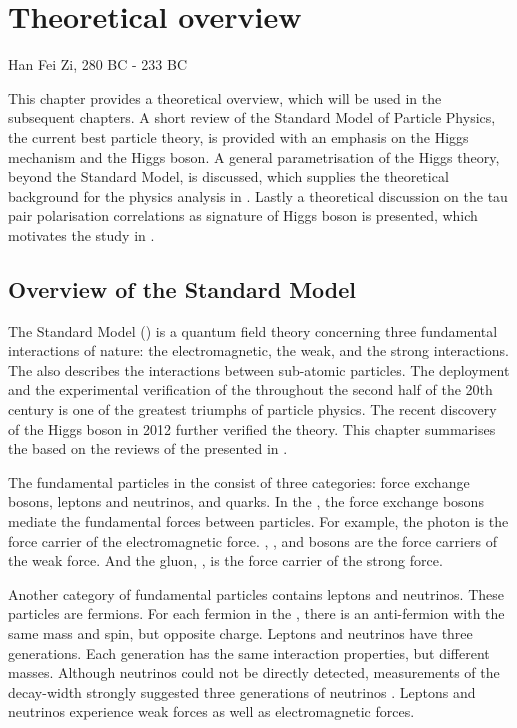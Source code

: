\chapter{Theoretical overview}
\label{chap:Theory}

%
{Han Fei Zi, 280 BC - 233 BC}%

This chapter provides a theoretical overview, which will be used in the subsequent  chapters. A short review of the Standard Model of Particle Physics, the current best particle theory, is provided with an emphasis on the Higgs mechanism and the Higgs boson. A general parametrisation of the Higgs theory, beyond the Standard Model, is discussed, which supplies the theoretical background for the physics analysis in . Lastly a theoretical discussion on the tau pair polarisation correlations as signature of Higgs boson is presented, which motivates the study in .

\section{Overview of the Standard Model}

The Standard Model (\SM) is a quantum field theory concerning three fundamental interactions of nature: the electromagnetic, the weak, and the strong interactions. The \SM also describes the interactions between sub-atomic particles. The deployment and the experimental verification of the \SM throughout the second half of the 20th century is one of the greatest triumphs of particle physics. The recent discovery of the Higgs boson in 2012 \cite{Aad:2012tfa,Chatrchyan:2012ufa} further verified the theory. This chapter summarises the \SM based on the reviews of the \SM presented in \cite{Agashe:2014kda,Thomson:2013zua,Tong:QFT,Gripaios:GFT}.

The fundamental particles in the \SM consist of three categories: force exchange bosons, leptons and neutrinos, and quarks. In the \SM, the force exchange bosons mediate the fundamental forces between particles. For example, the photon is the force carrier of the electromagnetic force. \PWp, \PWm, and \PZ  bosons are the force carriers of the weak force. And the gluon, \Pg, is the force carrier of the strong force.


Another category of fundamental particles contains leptons and neutrinos. These particles are fermions. For each fermion in the \SM, there is an anti-fermion with the same mass and spin, but opposite charge. Leptons and neutrinos have three generations. Each generation has the same interaction properties, but different masses. Although neutrinos could not be directly detected, measurements of the \PZ decay-width strongly suggested three generations of neutrinos \cite{ALEPH:2005ab}. Leptons and neutrinos experience weak forces as well as electromagnetic forces.

